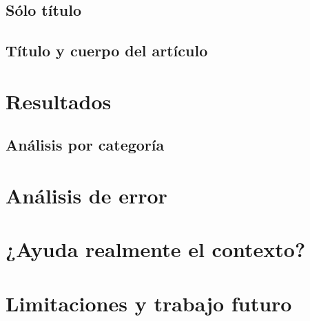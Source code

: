 \subsection{Sólo título}
\subsection{Título y cuerpo del artículo}

\section{Resultados}


\subsection{Análisis por categoría}

\section{Análisis de error}

\section{¿Ayuda realmente el contexto?}

\section{Limitaciones y trabajo futuro}